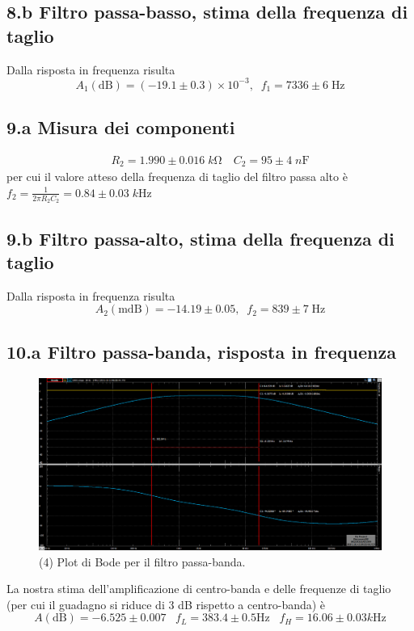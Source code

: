 \documentclass[10pt,a4paper]{article}
\begin{document}
\subsection*{8.b Filtro passa-basso, stima della frequenza di taglio}
Dalla risposta in frequenza risulta
\[
A_1(\mathrm{dB}) = \left(-19.1 \pm 0.3\right)\times 10^{-3},
\;\; f_1 = 7336 \pm 6 \; \si{\Hz}
\]

\subsection*{9.a Misura dei componenti}
\begin{align*}
R_2 = 1.990 \pm 0.016 \; \si{k\ohm} \quad C_2 = 95 \pm 4 \; \si{n\F}
\end{align*}
per cui il valore atteso della frequenza di taglio del filtro passa alto è
$f_2 = \frac{1}{2\pi R_2 C_2} = 0.84 \pm 0.03 \; \si{k\Hz}$
\subsection*{9.b Filtro passa-alto, stima della frequenza di taglio}
Dalla risposta in frequenza risulta
\[
A_2(\mathrm{mdB}) = -14.19 \pm 0.05, \;\; f_2 = 839 \pm 7 \; \si{\Hz}
\]

\subsection*{10.a Filtro passa-banda, risposta in frequenza}
\begin{figure}[htb]
\centering
\includegraphics[scale=0.35]{rc2k10nbpf}
\caption{(4) Plot di Bode per il filtro passa-banda.}
\end{figure}
La nostra stima dell'amplificazione di centro-banda e delle frequenze di 
taglio (per cui il guadagno si riduce di 3 dB rispetto a centro-banda) \`e
\[
A(\mathrm{dB}) = -6.525 \pm 0.007 \;\;\; f_{L} = 383.4 \pm 0.5 \si{\Hz} \;\;\;
f_{H} = 16.06 \pm 0.03 \si{k\Hz}
\]
\end{document}
